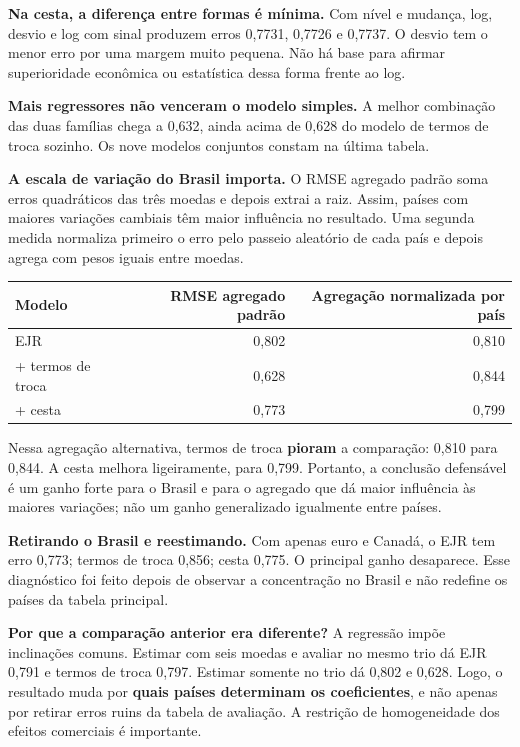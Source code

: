 \documentclass[10pt,a4paper]{article}
\newcommand{\pagina}[1]{\clearpage{\Large\bfseries\color{navy} #1}\par\vspace{6pt}}
\begin{document}
\textbf{Na cesta, a diferença entre formas é mínima.} Com nível e mudança, log, desvio e log com sinal produzem erros 0,7731, 0,7726 e 0,7737. O desvio tem o menor erro por uma margem muito pequena. Não há base para afirmar superioridade econômica ou estatística dessa forma frente ao log.

\textbf{Mais regressores não venceram o modelo simples.} A melhor combinação das duas famílias chega a 0,632, ainda acima de 0,628 do modelo de termos de troca sozinho. Os nove modelos conjuntos constam na última tabela.

\pagina{5. De onde vem o ganho agregado}
\textbf{A escala de variação do Brasil importa.} O RMSE agregado padrão soma erros quadráticos das três moedas e depois extrai a raiz. Assim, países com maiores variações cambiais têm maior influência no resultado. Uma segunda medida normaliza primeiro o erro pelo passeio aleatório de cada país e depois agrega com pesos iguais entre moedas.

{\small
\begin{center}\begin{tabular}{lrr}\toprule
Modelo & RMSE agregado padrão & Agregação normalizada por país \\ \midrule
EJR & 0,802 & 0,810 \\
+ termos de troca & 0,628 & 0,844 \\
+ cesta & 0,773 & 0,799 \\\bottomrule\end{tabular}\end{center}}

Nessa agregação alternativa, termos de troca \textbf{pioram} a comparação: 0,810 para 0,844. A cesta melhora ligeiramente, para 0,799. Portanto, a conclusão defensável é um ganho forte para o Brasil e para o agregado que dá maior influência às maiores variações; não um ganho generalizado igualmente entre países.

\textbf{Retirando o Brasil e reestimando.} Com apenas euro e Canadá, o EJR tem erro 0,773; termos de troca 0,856; cesta 0,775. O principal ganho desaparece. Esse diagnóstico foi feito depois de observar a concentração no Brasil e não redefine os países da tabela principal.

\textbf{Por que a comparação anterior era diferente?} A regressão impõe inclinações comuns. Estimar com seis moedas e avaliar no mesmo trio dá EJR 0,791 e termos de troca 0,797. Estimar somente no trio dá 0,802 e 0,628. Logo, o resultado muda por \textbf{quais países determinam os coeficientes}, e não apenas por retirar erros ruins da tabela de avaliação. A restrição de homogeneidade dos efeitos comerciais é importante.
\end{document}
